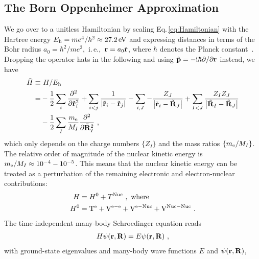 \subsection{The Born Oppenheimer Approximation}
We go over to a unitless Hamiltonian by scaling Eq.\,\eqref{eq:Hamiltonian} with the Hartree energy $E_{\rm h} = me^4 / \hbar^2 \approx 27.2\,{\rm eV}$ and expressing distances in terms of the Bohr radius $a_0 = \hbar^2 / m e^2$,~i.\,e.,~${\bf r} = a_0 \tilde{\bf r}$, where $\hbar$ denotes the Planck constant~. Dropping the operator hats in the following and using $\hat{\bf p}=-{\rm i} \hbar \partial / \partial {\bf r}$ instead, we have
\begin{align}
\begin{split}
    \tilde H 
        \equiv& ~H / E_{\rm h} \\
        =& 
        - \frac{1}{2} \sum_i \frac{\partial^2}{\partial \tilde{\bf r}_i^2}
        + \sum_{i < j} \frac{1}{\left|\tilde{{\bf r}}_{i}-\tilde{\bf r}_{j}\right|}
        - \sum_{i, J} -\frac{Z_J}{\left|\tilde{{\bf r}}_{i}-\tilde{\bf R}_{J}\right|}
        + \sum_{I < J} \frac{Z_{I} Z_{J}}{
            \left|\tilde{{\bf R}}_{I}-\tilde{\bf R}_{J}\right|} 
        \\
        &- \frac{1}{2} \sum_I \frac{m_{\rm e}}{M_I} \frac{\partial^2}{\partial \tilde{\bf R}_I^2}~,
    \label{eq:Hscaled}
\end{split}
\end{align}
which only depends on the charge numbers $\{Z_I\}$ and the mass ratios $\{ m_{\rm e} / M_I \}$. The relative order of magnitude of the nuclear kinetic energy is $m_{\rm e} / M_I \approx 10^{-4} - 10^{-5}$. This means that the nuclear kinetic energy can be treated as a perturbation of the remaining electronic and electron-nuclear contributions:
\begin{align}
    H   &= H^0 + T^{\rm Nuc}~, \text{ where} 
    \label{eq:H=H0+T}
    \\
    H^0 &=
        {\mathrm{T}}^{\mathrm{e}}
        + {\mathrm{V}}^{\mathrm{e}-\mathrm{e}}
        + {\mathrm{V}}^{\mathrm{e}-\mathrm{Nuc}}
        + {\mathrm{V}}^{\mathrm{Nuc}-\mathrm{Nuc}}~.
    \label{eq:H0}
\end{align}
The time-independent many-body Schroedinger equation reads
\begin{align}
    H \psi ({\bf r}, {\bf R}) = E \psi ({\bf r}, {\bf R})~,
    \label{eq:Schroedinger1}
\end{align}
with ground-state eigenvalues and many-body wave functions $E$ and \mbox{$\psi ({\bf r}, {\bf R})$},
